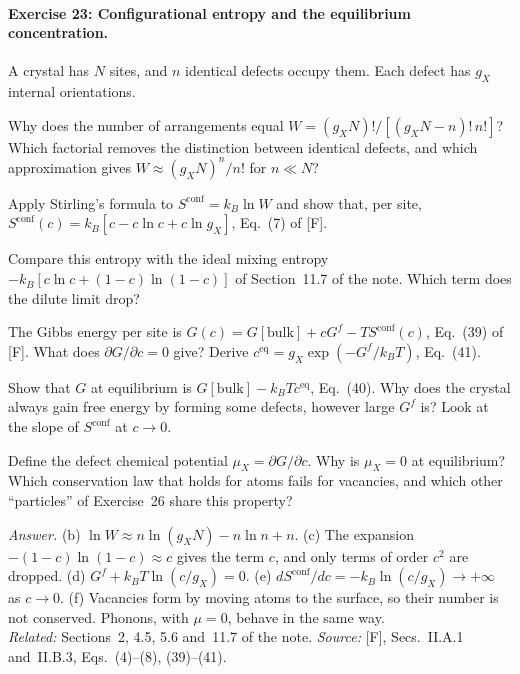 \documentclass[11pt]{article}      %
\numberwithin{equation}{section}   %
\begin{document}
\paragraph{Exercise 23: Configurational entropy and the equilibrium concentration.}
A crystal has $N$ sites, and $n$ identical defects occupy them. Each defect has $g_X$ internal orientations.
\begin{parts}
    \item Why does the number of arrangements equal $W = (g_XN)!/[(g_XN - n)!\,n!]$? Which factorial removes the distinction between identical defects, and which approximation gives $W \approx (g_XN)^n/n!$ for $n \ll N$?
    \item Apply Stirling's formula to $S^{\text{conf}} = k_B\ln W$ and show that, per site, $S^{\text{conf}}(c) = k_B[c - c\ln c + c\ln g_X]$, Eq.~(7) of [F].
    \item Compare this entropy with the ideal mixing entropy $-k_B[c\ln c + (1 - c)\ln(1 - c)]$ of Section~11.7 of the note. Which term does the dilute limit drop?
    \item The Gibbs energy per site is $G(c) = G[\text{bulk}] + cG^f - TS^{\text{conf}}(c)$, Eq.~(39) of [F]. What does $\partial G/\partial c = 0$ give? Derive $c^{\text{eq}} = g_X\exp(-G^f/k_BT)$, Eq.~(41).
    \item Show that $G$ at equilibrium is $G[\text{bulk}] - k_BTc^{\text{eq}}$, Eq.~(40). Why does the crystal always gain free energy by forming some defects, however large $G^f$ is? Look at the slope of $S^{\text{conf}}$ at $c \to 0$.
    \item Define the defect chemical potential $\mu_X = \partial G/\partial c$. Why is $\mu_X = 0$ at equilibrium? Which conservation law that holds for atoms fails for vacancies, and which other ``particles'' of Exercise~26 share this property?
\end{parts}
\textit{Answer.} (b) $\ln W \approx n\ln(g_XN) - n\ln n + n$. (c) The expansion $-(1 - c)\ln(1 - c) \approx c$ gives the term $c$, and only terms of order $c^2$ are dropped. (d) $G^f + k_BT\ln(c/g_X) = 0$. (e) $dS^{\text{conf}}/dc = -k_B\ln(c/g_X) \to +\infty$ as $c \to 0$. (f) Vacancies form by moving atoms to the surface, so their number is not conserved. Phonons, with $\mu = 0$, behave in the same way.\\
\textit{Related:} Sections~2, 4.5, 5.6 and~11.7 of the note. \textit{Source:} [F], Secs.~II.A.1 and~II.B.3, Eqs.~(4)--(8), (39)--(41).

\end{document}
